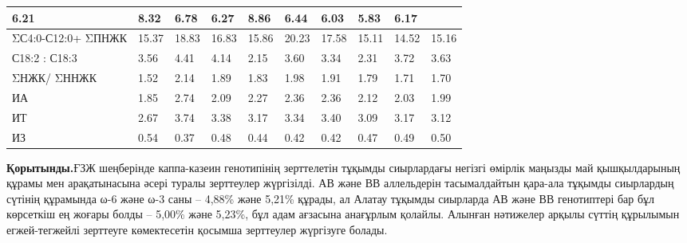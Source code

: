 \begin{table}[H]
{\begin{tabular}{|l|lll|lll|lll|}
    \multicolumn{1}{l|}{6.21} &
    \multicolumn{1}{l|}{8.32} &
    6.78 &
    \multicolumn{1}{l|}{6.27} &
    \multicolumn{1}{l|}{8.86} &
    6.44 &
    \multicolumn{1}{l|}{6.03} &
    \multicolumn{1}{l|}{5.83} &
    6.17 \\ \hline
  ΣС4:0-С12:0+   ΣПНЖК &
    \multicolumn{1}{l|}{15.37} &
    \multicolumn{1}{l|}{18.83} &
    16.83 &
    \multicolumn{1}{l|}{15.86} &
    \multicolumn{1}{l|}{20.23} &
    17.58 &
    \multicolumn{1}{l|}{15.11} &
    \multicolumn{1}{l|}{14.52} &
    15.16 \\ \hline
  С18:2 : С18:3 &
    \multicolumn{1}{l|}{3.56} &
    \multicolumn{1}{l|}{4.41} &
    4.14 &
    \multicolumn{1}{l|}{2.15} &
    \multicolumn{1}{l|}{3.60} &
    3.34 &
    \multicolumn{1}{l|}{2.31} &
    \multicolumn{1}{l|}{3.72} &
    3.63 \\ \hline
  ΣНЖК/ ΣННЖК &
    \multicolumn{1}{l|}{1.52} &
    \multicolumn{1}{l|}{2.14} &
    1.89 &
    \multicolumn{1}{l|}{1.83} &
    \multicolumn{1}{l|}{1.98} &
    1.91 &
    \multicolumn{1}{l|}{1.79} &
    \multicolumn{1}{l|}{1.71} &
    1.70 \\ \hline
  ИА &
    \multicolumn{1}{l|}{1.85} &
    \multicolumn{1}{l|}{2.74} &
    2.09 &
    \multicolumn{1}{l|}{2.27} &
    \multicolumn{1}{l|}{2.36} &
    2.36 &
    \multicolumn{1}{l|}{2.12} &
    \multicolumn{1}{l|}{2.03} &
    1.99 \\ \hline
  ИТ &
    \multicolumn{1}{l|}{2.67} &
    \multicolumn{1}{l|}{3.74} &
    3.38 &
    \multicolumn{1}{l|}{3.17} &
    \multicolumn{1}{l|}{3.34} &
    3.40 &
    \multicolumn{1}{l|}{3.09} &
    \multicolumn{1}{l|}{3.17} &
    3.12 \\ \hline
  ИЗ &
    \multicolumn{1}{l|}{0.54} &
    \multicolumn{1}{l|}{0.37} &
    0.48 &
    \multicolumn{1}{l|}{0.44} &
    \multicolumn{1}{l|}{0.42} &
    0.42 &
    \multicolumn{1}{l|}{0.47} &
    \multicolumn{1}{l|}{0.49} &
    0.50 \\ \hline
  \end{tabular}%
  }
\end{table}

\begin{multicols}{2}

{\bfseries Қорытынды.}ҒЗЖ шеңберінде каппа-казеин генотипінің зерттелетін
тұқымды сиырлардағы негізгі өмірлік маңызды май қышқылдарының құрамы мен
арақатынасына әсері туралы зерттеулер жүргізілді. АВ және ВВ аллельдерін
тасымалдайтын қара-ала тұқымды сиырлардың сүтінің құрамында ω-6 және ω-3
саны -- 4,88\% және 5,21\% құрады, ал Алатау тұқымды сиырларда АВ және
ВВ генотиптері бар бұл көрсеткіш ең жоғары болды -- 5,00\% және 5,23\%,
бұл адам ағзасына анағұрлым қолайлы. Алынған нәтижелер арқылы сүттің
құрылымын егжей-тегжейлі зерттеуге көмектесетін қосымша зерттеулер
жүргізуге болады.
\end{multicols}


